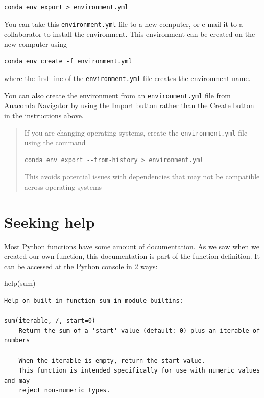 \documentclass[
  letterpaper,
]{scrbook}
\newenvironment{Shaded}{\begin{snugshade}}{\end{snugshade}}
\newcommand{\BuiltInTok}[1]{#1}
\newcommand{\NormalTok}[1]{#1}
\begin{document}
\begin{verbatim}
conda env export > environment.yml
\end{verbatim}

You can take this \texttt{environment.yml} file to a new computer, or e-mail it to a collaborator to install the environment. This environment can be created on the new computer using

\begin{verbatim}
conda env create -f environment.yml
\end{verbatim}

where the first line of the \texttt{environment.yml} file creates the environment name.

You can also create the environment from an \texttt{environment.yml} file from Anaconda Navigator by using the Import button rather than the Create button in the instructions above.

\begin{quote}
If you are changing operating systems, create the \texttt{environment.yml} file using the command

\begin{verbatim}
conda env export --from-history > environment.yml
\end{verbatim}

This avoids potential issues with dependencies that may not be compatible across operating systems
\end{quote}

\hypertarget{seeking-help}{%
\section{Seeking help}\label{seeking-help}}

Most Python functions have some amount of documentation. As we saw when we created our own function, this documentation is part of the function definition. It can be accessed at the Python console in 2 ways:

\begin{Shaded}
\begin{Highlighting}[]
\BuiltInTok{help}\NormalTok{(}\BuiltInTok{sum}\NormalTok{)}
\end{Highlighting}
\end{Shaded}

\begin{verbatim}
Help on built-in function sum in module builtins:

sum(iterable, /, start=0)
    Return the sum of a 'start' value (default: 0) plus an iterable of numbers
    
    When the iterable is empty, return the start value.
    This function is intended specifically for use with numeric values and may
    reject non-numeric types.
\end{verbatim}
\end{document}
